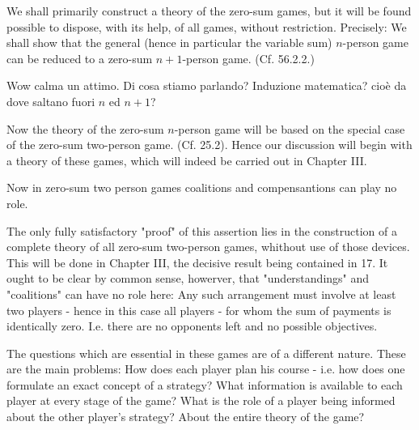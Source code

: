 We shall primarily construct a theory of the zero-sum games, but it will be found possible to dispose, with its help, of all games, without restriction. Precisely: We shall show that the general (hence in particular the variable sum) $n$-person game can be reduced to a zero-sum $n+1$-person game. (Cf. 56.2.2.) 

Wow calma un attimo. Di cosa stiamo parlando? Induzione matematica? cio\`e da dove saltano fuori $n$ ed $n+1$?

Now the theory of the zero-sum $n$-person game will be based on the special case of the zero-sum two-person game. (Cf. 25.2). Hence our discussion will begin with a theory of these games, which will indeed be carried out in Chapter III.

Now in zero-sum two person games coalitions and compensantions can play no role. 

The only fully satisfactory "proof" of this assertion lies in the construction of a complete theory of all zero-sum two-person games, whithout use of those devices. This will be done in Chapter III, the decisive result being contained in 17. It ought to be clear by common sense, howerver, that "understandings" and "coalitions" can have no role here: Any such arrangement must involve at least two players - hence in this case all players - for whom the sum of payments is identically zero. I.e. there are no opponents left and no possible objectives.

The questions which are essential in these games are of a different nature. These are the main problems: How does each player plan his course - i.e. how does one formulate an exact concept of a strategy? What information is available to each player at every stage of the game? What is the role of a player being informed about the other player's strategy? About the entire theory of the game?